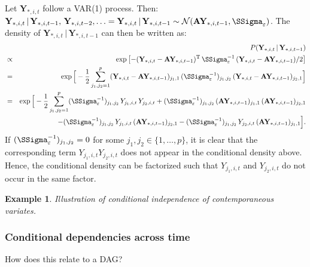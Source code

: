 \documentclass[a4paper]{article}
\theoremstyle{myexamplestyle}
\newtheorem{example}{Example}
\begin{document}
Let $\mathbf{Y}_{\ast, i, t}$ follow a VAR(1) process. Then:
$\mathbf{Y}_{\ast, i, t} \, | \, \mathbf{Y}_{\ast, i, t-1}, \, \mathbf{Y}_{\ast, i, t-2}, \ldots = \mathbf{Y}_{\ast, i, t} \, | \, \mathbf{Y}_{\ast, i, t-1} \sim \mathcal{N}( \mathbf{A} \mathbf{Y}_{\ast, i, t-1}, \SSigma_{\varepsilon})$. The density of $\mathbf{Y}_{\ast, i, t} \, | \, \mathbf{Y}_{\ast, i, t-1}$ can then be written as:
\begin{eqnarray*}
& & \hspace{-1.5cm} P(\mathbf{Y}_{\ast, i, t} \, | \, \mathbf{Y}_{\ast, i, t-1})
\\
& \propto & \exp \left[ -(\mathbf{Y}_{\ast, i, t}  - \mathbf{A} \mathbf{Y}_{\ast, i, t-1})^{\mathrm{T}} \, \SSigma_{\varepsilon}^{-1}
\, (\mathbf{Y}_{\ast, i, t}  - \mathbf{A} \mathbf{Y}_{\ast, i, t-1}) / 2 \right]
\\
& = & \exp \Big[ -\frac{1}{2} \sum_{j_1, j_2=1}^p (\mathbf{Y}_{\ast, i, t}  - \mathbf{A} \mathbf{Y}_{\ast, i, t-1})_{j_1, 1} \,  (\SSigma_{\varepsilon}^{-1})_{j_1, j_2} \, (\mathbf{Y}_{\ast, i, t}  - \mathbf{A} \mathbf{Y}_{\ast, i, t-1})_{j_2, 1} \Big]
\\
& = & \exp \Big[ -\frac{1}{2} \sum_{j_1, j_2=1}^p
(\SSigma_{\varepsilon}^{-1})_{j_1, j_2} \, Y_{j_1, i, t} \,
Y_{j_2, i, t} + (\SSigma_{\varepsilon}^{-1})_{j_1, j_2} \,
(\mathbf{A} \mathbf{Y}_{\ast, i, t-1})_{j_1, 1} \,
(\mathbf{A} \mathbf{Y}_{\ast, i, t-1})_{j_2, 1}
\\
&  & \qquad \qquad  - (\SSigma_{\varepsilon}^{-1})_{j_1, j_2} \,
Y_{j_1, i, t} \, (\mathbf{A} \mathbf{Y}_{\ast, i, t-1})_{j_2, 1}
- (\SSigma_{\varepsilon}^{-1})_{j_1, j_2} \, Y_{j_2, i, t} \,
(\mathbf{A} \mathbf{Y}_{\ast, i, t-1})_{j_1, 1} \Big].
\end{eqnarray*}
If $(\SSigma_{\varepsilon}^{-1})_{j_1, j_2} = 0$ for some $j_1, j_2 \in \{ 1, \ldots, p \}$, it is clear that the corresponding term
$Y_{j_1, i, t} Y_{j_2, i, t}$ does not appear in the conditional density above. Hence, the conditional density can be factorized such that $Y_{j_1, i, t}$ and $Y_{j_2, i, t}$ do not occur in the same factor.


\begin{example}
\textit{Illustration of conditional independence of contemporaneous variates.}
\end{example}


\subsubsection{Conditional dependencies across time}
How does this relate to a DAG?
\end{document}
